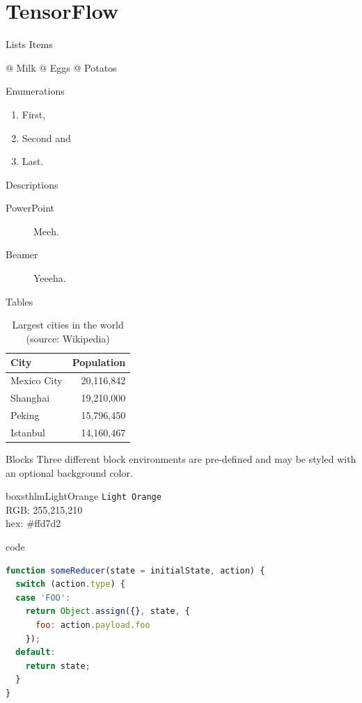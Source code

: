 \documentclass{beamer}
\begin{document}
\section{TensorFlow}
\begin{frame}[fragile]{Lists}
Items
\begin{easylist}[itemize]
@ Milk
@ Eggs
@ Potatos
\end{easylist}

Enumerations
\begin{enumerate}
\item First, \item Second and \item Last.
\end{enumerate}

Descriptions
\begin{description}
\item[PowerPoint] Meeh. \item[Beamer] Yeeeha.
\end{description}
\end{frame}

\begin{frame}[fragile]{Tables}
\begin{table}
\caption{Largest cities in the world (source: Wikipedia)}
\begin{tabular}{lr}
\toprule
City & Population\\
\midrule
Mexico City & 20,116,842\\
Shanghai & 19,210,000\\
Peking & 15,796,450\\
Istanbul & 14,160,467\\
\bottomrule
\end{tabular}
\end{table}
\end{frame}

\begin{frame}{Blocks}
Three different block environments are pre-defined and may be styled with an
optional background color.

\begin{beamercolorbox}[wd=\linewidth,ht=10ex,dp=3ex]{boxsthlmLightOrange}
\centering
\texttt{Light Orange}\\
\vspace{1em}
\tiny{RGB:  255,215,210} \\
\tiny{hex: \#ffd7d2}
\end{beamercolorbox}
\end{frame}

\begin{frame}[fragile]{code}
\begin{lstlisting}[language=JavaScript, caption=My Javascript Example]
function someReducer(state = initialState, action) {
  switch (action.type) {
  case 'FOO':
    return Object.assign({}, state, {
      foo: action.payload.foo
    });
  default:
    return state;
  }
}
\end{lstlisting}
\end{frame}
\end{document}
